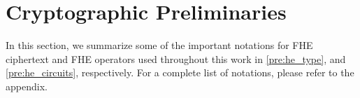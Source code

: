 \section{Cryptographic Preliminaries}

In this section, we summarize some of the important notations for FHE ciphertext
and FHE operators used throughout this work in \cref{pre:he_type},
and \cref{pre:he_circuits}, respectively.
For a complete list of notations, please refer to the appendix. 










